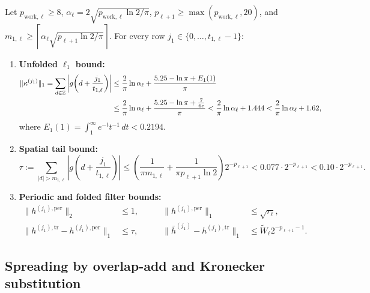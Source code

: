\begin{lemma}\label{lem:filter-norms}
Let $p_{\mathrm{work},\ell} \ge 8$, $\alpha_\ell = 2\sqrt{p_{\mathrm{work},\ell} \ln 2 / \pi}$, $p_{\ell+1} \ge \max(p_{\mathrm{work},\ell}, 20)$, and $m_{1,\ell} \ge \left\lceil \alpha_\ell\sqrt{p_{\ell+1} \ln 2 / \pi} \right\rceil$. For every row $j_1 \in \{0, \dots, t_{1,\ell}-1\}$:
\begin{enumerate}[label=\textbf{\arabic*.},leftmargin=*]
  \item \textbf{Unfolded $\ell_1$ bound:}
  \begin{equation}\label{eq:unfolded-l1}
    \begin{aligned}
      \|\kappa^{(j_1)}\|_1 = \sum_{d \in \mathbb{Z}} \left|g\!\left(d + \frac{j_1}{t_{1,\ell}}\right)\right|
      &\le \frac{2}{\pi}\ln\alpha_\ell + \frac{5.25 - \ln\pi + E_1(1)}{\pi} \\
      &\le \frac{2}{\pi}\ln\alpha_\ell + \frac{5.25 - \ln\pi + \frac{7}{6e}}{\pi} < \frac{2}{\pi}\ln\alpha_\ell + 1.444 < \frac{2}{\pi}\ln\alpha_\ell + 1.62,
    \end{aligned}
  \end{equation}
  where $E_1(1) = \int_1^\infty e^{-t} t^{-1}\,dt < 0.2194$.
  \item \textbf{Spatial tail bound:}
  \begin{equation}\label{eq:spatial-tail}
    \tau := \sum_{|d| > m_{1,\ell}} \left|g\!\left(d + \frac{j_1}{t_{1,\ell}}\right)\right| \le \left(\frac{1}{\pi m_{1,\ell}} + \frac{1}{\pi p_{\ell+1} \ln 2}\right) 2^{-p_{\ell+1}} < 0.077 \cdot 2^{-p_{\ell+1}} < 0.10 \cdot 2^{-p_{\ell+1}}.
  \end{equation}
  \item \textbf{Periodic and folded filter bounds:}
  \begin{equation}\label{eq:periodic-norms}
    \begin{aligned}
      \|h^{(j_1),\mathrm{per}}\|_2 &\le 1, \qquad & \|h^{(j_1),\mathrm{per}}\|_1 &\le \sqrt{r_\ell}, \\
      \|h^{(j_1),\mathrm{tr}} - h^{(j_1),\mathrm{per}}\|_1 &\le \tau, \qquad & \|\bar{h}^{(j_1)} - h^{(j_1),\mathrm{tr}}\|_1 &\le \tilde{W}_\ell 2^{-p_{\ell+1}-1}.
    \end{aligned}
  \end{equation}
\end{enumerate}
\end{lemma}

\subsection{Spreading by overlap-add and Kronecker substitution}\label{sec:kronecker}

